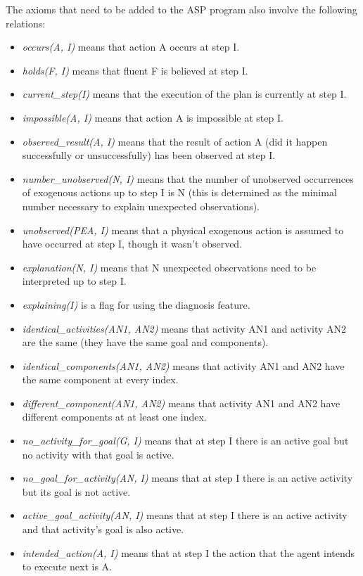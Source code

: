 \documentclass[11pt, oneside]{article}
\begin{document}
The axioms that need to be added to the ASP program also involve the following relations:
\begin{itemize}
\item \textit{occurs(A, I)} means that action A occurs at step I.
\item \textit{holds(F, I)} means that fluent F is believed at step I.
\item \textit{current\_step(I)} means that the execution of the plan is currently at step I.
\item \textit{impossible(A, I)} means that action A is impossible at step I.
\item \textit{observed\_result(A, I)} means that the result of action A (did it happen successfully or unsuccessfully) has been observed at step I.
\item \textit{number\_unobserved(N, I)} means that the number of unobserved occurrences of exogenous actions up to step I is N (this is determined as the minimal number necessary to explain unexpected observations).
\item \textit{unobserved(PEA, I)} means that a physical exogenous action is assumed to have occurred at step I, though it wasn't observed.
\item \textit{explanation(N, I)} means that N unexpected observations need to be interpreted up to step I.
\item \textit{explaining(I)} is a flag for using the diagnosis feature.
\item \textit{identical\_activities(AN1, AN2)} means that activity AN1 and activity AN2 are the same (they have the same goal and components).
\item \textit{identical\_components(AN1, AN2)} means that activity AN1 and AN2 have the same component at every index.
\item \textit{different\_component(AN1, AN2)} means that activity AN1 and AN2 have different components at at least one index.
\item \textit{no\_activity\_for\_goal(G, I)} means that at step I there is an active goal but no activity with that goal is active.
\item \textit{no\_goal\_for\_activity(AN, I)} means that at step I there is an active activity but its goal is not active.
\item \textit{active\_goal\_activity(AN, I)} means that at step I there is an active activity and that activity's goal is also active.
\item \textit{intended\_action(A, I)} means that at step I the action that the agent intends to execute next is A.

\end{itemize}
\end{document}
